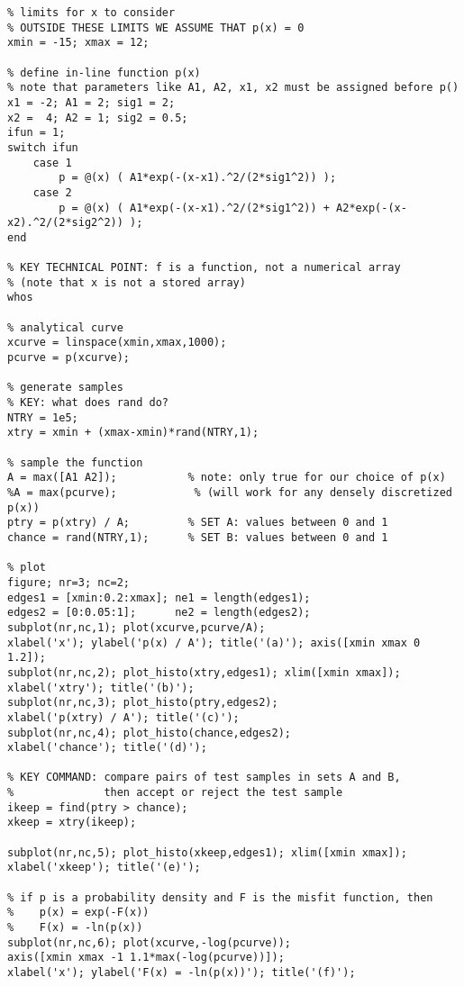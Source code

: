 \documentclass[11pt,titlepage,fleqn]{article}
\begin{document}
\tiny
\begin{spacing}{1.0}
\begin{verbatim}
% limits for x to consider
% OUTSIDE THESE LIMITS WE ASSUME THAT p(x) = 0
xmin = -15; xmax = 12;

% define in-line function p(x)
% note that parameters like A1, A2, x1, x2 must be assigned before p()
x1 = -2; A1 = 2; sig1 = 2;
x2 =  4; A2 = 1; sig2 = 0.5;
ifun = 1;
switch ifun
    case 1
        p = @(x) ( A1*exp(-(x-x1).^2/(2*sig1^2)) );
    case 2
        p = @(x) ( A1*exp(-(x-x1).^2/(2*sig1^2)) + A2*exp(-(x-x2).^2/(2*sig2^2)) );
end

% KEY TECHNICAL POINT: f is a function, not a numerical array
% (note that x is not a stored array)
whos

% analytical curve
xcurve = linspace(xmin,xmax,1000);
pcurve = p(xcurve);

% generate samples
% KEY: what does rand do?
NTRY = 1e5;
xtry = xmin + (xmax-xmin)*rand(NTRY,1);

% sample the function
A = max([A1 A2]);           % note: only true for our choice of p(x)
%A = max(pcurve);            % (will work for any densely discretized p(x))
ptry = p(xtry) / A;         % SET A: values between 0 and 1
chance = rand(NTRY,1);      % SET B: values between 0 and 1

% plot
figure; nr=3; nc=2;
edges1 = [xmin:0.2:xmax]; ne1 = length(edges1);
edges2 = [0:0.05:1];      ne2 = length(edges2);
subplot(nr,nc,1); plot(xcurve,pcurve/A);
xlabel('x'); ylabel('p(x) / A'); title('(a)'); axis([xmin xmax 0 1.2]);
subplot(nr,nc,2); plot_histo(xtry,edges1); xlim([xmin xmax]);
xlabel('xtry'); title('(b)'); 
subplot(nr,nc,3); plot_histo(ptry,edges2);
xlabel('p(xtry) / A'); title('(c)'); 
subplot(nr,nc,4); plot_histo(chance,edges2);
xlabel('chance'); title('(d)'); 

% KEY COMMAND: compare pairs of test samples in sets A and B,
%              then accept or reject the test sample
ikeep = find(ptry > chance);
xkeep = xtry(ikeep);

subplot(nr,nc,5); plot_histo(xkeep,edges1); xlim([xmin xmax]);
xlabel('xkeep'); title('(e)');

% if p is a probability density and F is the misfit function, then
%    p(x) = exp(-F(x))
%    F(x) = -ln(p(x))
subplot(nr,nc,6); plot(xcurve,-log(pcurve));
axis([xmin xmax -1 1.1*max(-log(pcurve))]);
xlabel('x'); ylabel('F(x) = -ln(p(x))'); title('(f)');
\end{verbatim}
\end{spacing}

\end{document}
